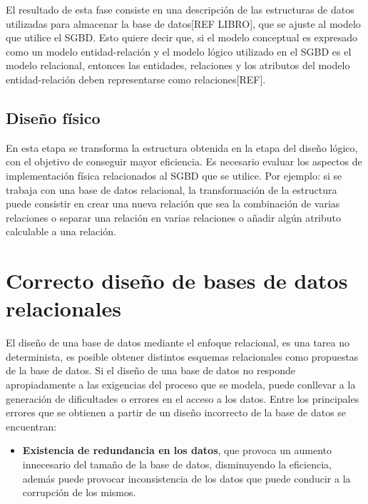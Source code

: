 El resultado de esta fase consiste en una descripción de las estructuras 
de datos utilizadas para almacenar la base de datos[REF LIBRO], que se 
ajuste al modelo que utilice el SGBD. Esto quiere decir que,
si el modelo conceptual es expresado como un modelo 
entidad-relación y el modelo lógico utilizado en el SGBD es el modelo 
relacional, entonces las entidades, relaciones y los atributos del modelo entidad-relación
deben representarse como relaciones[REF]. 



\subsection{Diseño físico}
En esta etapa se transforma la estructura obtenida en la etapa del diseño
lógico, con el objetivo de conseguir mayor eficiencia. Es necesario
evaluar los aspectos de implementación física relacionados al SGBD que se utilice.
Por ejemplo: si se trabaja con una base de datos relacional, la 
transformación de la estructura puede consistir en crear una nueva relación que 
sea la combinación de varias relaciones o separar una relación en varias relaciones o 
añadir algún atributo calculable a una relación. \\





\section{Correcto diseño de bases de datos relacionales}

El diseño de una base de datos mediante el enfoque relacional, es una 
tarea no determinista, es posible obtener distintos esquemas relacionales 
como propuestas de la base de datos.
Si el diseño de una base de datos no responde apropiadamente a las exigencias
del proceso que se modela, puede conllevar a la generación de dificultades o 
errores en el acceso a los datos. Entre los principales errores que se obtienen 
a partir de un diseño incorrecto de la base de datos se encuentran:

\begin{itemize}
    \item \textbf{Existencia de redundancia en los datos}, que provoca un aumento innecesario 
    del tamaño de la base de datos, disminuyendo la eficiencia, además puede provocar 
    inconsistencia de los datos que puede conducir a la corrupción de los mismos. 
\end{itemize}


